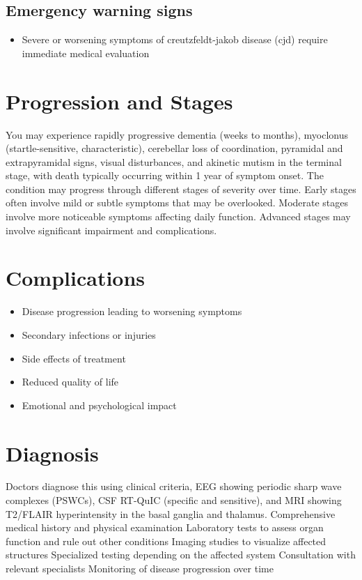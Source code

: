 \subsection{Emergency warning signs}
\begin{itemize}[noitemsep]
  \item Severe or worsening symptoms of creutzfeldt-jakob disease (cjd) require immediate medical evaluation
\end{itemize}
\section{Progression and Stages}
You may experience rapidly progressive dementia (weeks to months), myoclonus (startle-sensitive, characteristic), cerebellar loss of coordination, pyramidal and extrapyramidal signs, visual disturbances, and akinetic mutism in the terminal stage, with death typically occurring within 1 year of symptom onset. The condition may progress through different stages of severity over time. Early stages often involve mild or subtle symptoms that may be overlooked. Moderate stages involve more noticeable symptoms affecting daily function. Advanced stages may involve significant impairment and complications.
\section{Complications}
\begin{itemize}[noitemsep]
  \item Disease progression leading to worsening symptoms
  \item Secondary infections or injuries
  \item Side effects of treatment
  \item Reduced quality of life
  \item Emotional and psychological impact
\end{itemize}
\section{Diagnosis}
Doctors diagnose this using clinical criteria, EEG showing periodic sharp wave complexes (PSWCs), CSF RT-QuIC (specific and sensitive), and MRI showing T2/FLAIR hyperintensity in the basal ganglia and thalamus. Comprehensive medical history and physical examination Laboratory tests to assess organ function and rule out other conditions Imaging studies to visualize affected structures Specialized testing depending on the affected system Consultation with relevant specialists Monitoring of disease progression over time


